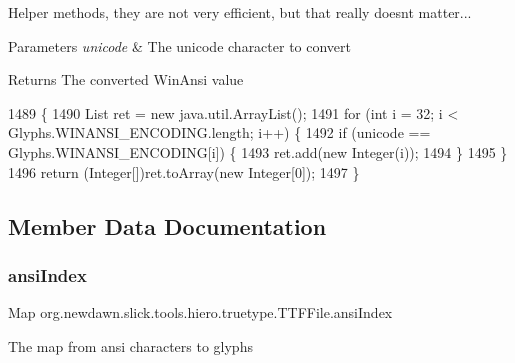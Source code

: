 Helper methods, they are not very efficient, but that really doesn\textquotesingle{}t matter...


\begin{DoxyParams}{Parameters}
{\em unicode} & The unicode character to convert \\
\hline
\end{DoxyParams}
\begin{DoxyReturn}{Returns}
The converted Win\+Ansi value 
\end{DoxyReturn}

\begin{DoxyCode}
1489                                                     \{
1490         List ret = \textcolor{keyword}{new} java.util.ArrayList();
1491         \textcolor{keywordflow}{for} (\textcolor{keywordtype}{int} i = 32; i < Glyphs.WINANSI\_ENCODING.length; i++) \{
1492             \textcolor{keywordflow}{if} (unicode == Glyphs.WINANSI\_ENCODING[i]) \{
1493                 ret.add(\textcolor{keyword}{new} Integer(i));
1494             \}
1495         \}
1496         \textcolor{keywordflow}{return} (Integer[])ret.toArray(\textcolor{keyword}{new} Integer[0]);
1497     \}
\end{DoxyCode}


\subsection{Member Data Documentation}
\mbox{\label{classorg_1_1newdawn_1_1slick_1_1tools_1_1hiero_1_1truetype_1_1_t_t_f_file_a2c884e548a3215ea5c3e3c4ad32f1f73}} 
\subsubsection{\texorpdfstring{ansi\+Index}{ansiIndex}}
{\footnotesize\ttfamily Map org.\+newdawn.\+slick.\+tools.\+hiero.\+truetype.\+T\+T\+F\+File.\+ansi\+Index\hspace{0.3cm}{\ttfamily [private]}}

The map from ansi characters to glyphs \mbox{\label{classorg_1_1newdawn_1_1slick_1_1tools_1_1hiero_1_1truetype_1_1_t_t_f_file_ac4b9a9e2d782475f624524e45411a0c3}} 
